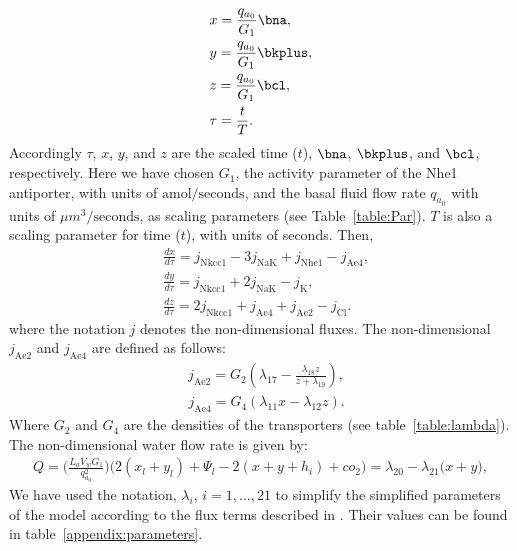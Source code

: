 \begin{align*}
& x = \frac{q_{a_0}}{G_1} \bna,\\
& y = \frac{q_{a_0}}{G_1} \bkplus,\\
& z = \frac{q_{a_0}}{G_1} \bcl,\\
& \tau = \frac{t}{T}.
\end{align*}
Accordingly $\tau$, $x$, $y$, and $z$ are the scaled time ($t$), $\bna$, $\bkplus$, and $\bcl$, respectively. Here we have chosen $G_1$, the activity parameter of the Nhe1 antiporter, with units of $\text{amol}/\text{seconds}$, and the basal fluid flow rate $q_{a_0}$ with units of $\mu m^3/ \text{seconds}$, as scaling parameters (see Table~\ref{table:Par}). $T$ is also a scaling parameter for time ($t$), with units of seconds. Then,
\begin{align}
& \frac{dx}{d\tau}=j_{\text{Nkcc1}}-3j_{\text{NaK}}+ j_{\text{Nhe1}}-j_{\text{Ae4}},\\
&\frac{dy}{d\tau}=j_{\text{Nkcc1}}+2 j_{\text{NaK}}-j_{\text{K}},\\
& \frac{dz}{d\tau}=2j_{\text{Nkcc1}}+j_{\text{Ae4}}+j_{\text{Ae2}}-j_{\text{Cl}}.
\end{align}
where the notation $j$ denotes the non-dimensional fluxes. The non-dimensional $ j_{\text{Ae2}}$ and $j_{\text{Ae4}}$ are defined as follows: 
{\small
\begin{align*}
&j_{\text{Ae2}} = G_{2}\left(\lambda_{17}-\frac{\lambda_{18}z}{z+\lambda_{19}}\right),
\end{align*}
}
{\small
\begin{align*}
&  j_{\text{Ae4}}= G_{4}\left( \lambda_{11}x-\lambda_{12}z\right).
\end{align*}
}
Where $G_2$ and $G_4$ are the densities of the transporters (see table~\ref{table:lambda}). The non-dimensional water flow rate is given by:
{\small
\begin{align}
\label{eq:non_Q}
Q=\Bigg(\frac{L_a V_w G_1}{q_{a_0}^2}\Bigg) \Bigg( 2 ( x_l + y_l ) + \Psi_l - 2 ( x + y + h_i) + co_2 \Bigg) = \lambda_{20}-\lambda_{21} \Bigg( x + y \Bigg),
\end{align}
}
We have used the notation, $\lambda_i$, $i=1,...,21$ to simplify the simplified parameters of the model according to the flux terms described in \cite{siguenza2017Ae4}. Their values can be found in table~\ref{appendix:parameters}.\\
